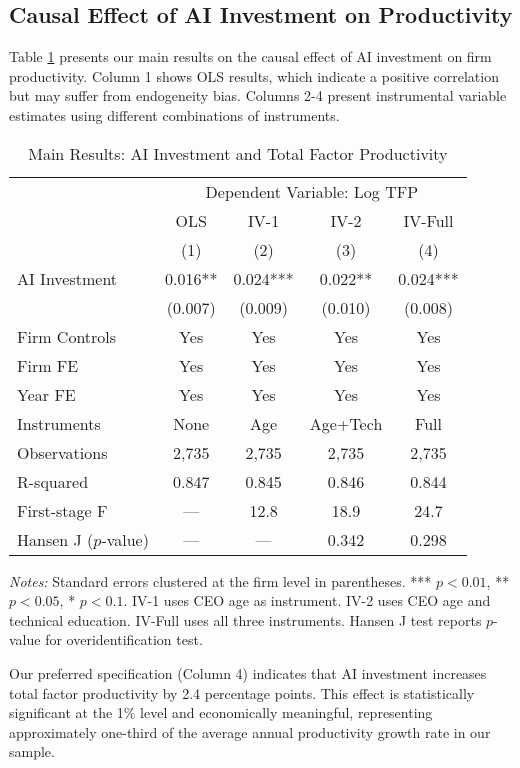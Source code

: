 \documentclass[12pt, a4paper]{article}
\begin{document}
\subsection{Causal Effect of AI Investment on Productivity}
Table \ref{tab:main_results} presents our main results on the causal effect of AI investment on firm productivity. Column 1 shows OLS results, which indicate a positive correlation but may suffer from endogeneity bias. Columns 2-4 present instrumental variable estimates using different combinations of instruments.

\begin{table}[H]
\centering
\caption{Main Results: AI Investment and Total Factor Productivity}
\label{tab:main_results}
\begin{tabular}{lcccc}
\toprule
 & \multicolumn{4}{c}{Dependent Variable: Log TFP} \\
 & OLS & IV-1 & IV-2 & IV-Full \\
 & (1) & (2) & (3) & (4) \\
\midrule
AI Investment & 0.016** & 0.024*** & 0.022** & 0.024*** \\
 & (0.007) & (0.009) & (0.010) & (0.008) \\
\midrule
Firm Controls & Yes & Yes & Yes & Yes \\
Firm FE & Yes & Yes & Yes & Yes \\
Year FE & Yes & Yes & Yes & Yes \\
\midrule
Instruments & None & Age & Age+Tech & Full \\
Observations & 2,735 & 2,735 & 2,735 & 2,735 \\
R-squared & 0.847 & 0.845 & 0.846 & 0.844 \\
First-stage F & --- & 12.8 & 18.9 & 24.7 \\
Hansen J ($p$-value) & --- & --- & 0.342 & 0.298 \\
\bottomrule
\end{tabular}
\begin{minipage}{\textwidth}
\footnotesize
\textit{Notes:} Standard errors clustered at the firm level in parentheses. *** $p<0.01$, ** $p<0.05$, * $p<0.1$. IV-1 uses CEO age as instrument. IV-2 uses CEO age and technical education. IV-Full uses all three instruments. Hansen J test reports $p$-value for overidentification test.
\end{minipage}
\end{table}

Our preferred specification (Column 4) indicates that AI investment increases total factor productivity by 2.4 percentage points. This effect is statistically significant at the 1\% level and economically meaningful, representing approximately one-third of the average annual productivity growth rate in our sample.
\end{document}
